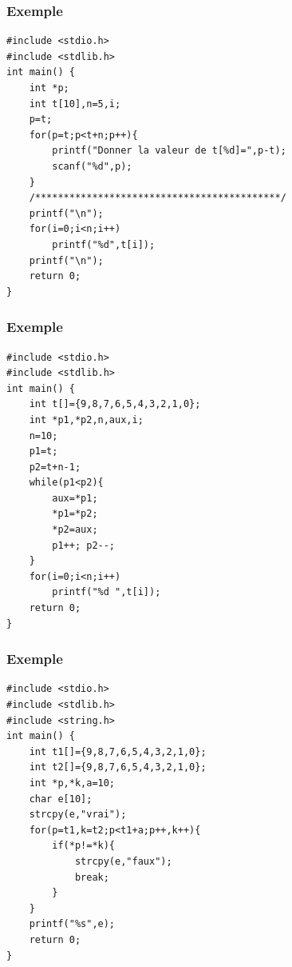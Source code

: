 \documentclass{beamer}
\begin{document}

\begin{frame}[fragile]
\frametitle{Exemple}

\begin{verbatim}
#include <stdio.h>
#include <stdlib.h>
int main() {
    int *p;
    int t[10],n=5,i;
    p=t;
    for(p=t;p<t+n;p++){
        printf("Donner la valeur de t[%d]=",p-t);
        scanf("%d",p);
    }
    /*******************************************/
    printf("\n");
    for(i=0;i<n;i++)
        printf("%d",t[i]);
    printf("\n");	
    return 0;
}
\end{verbatim}

\end{frame}


\begin{frame}[fragile]
\frametitle{Exemple}

\begin{verbatim}
#include <stdio.h>
#include <stdlib.h>
int main() {
    int t[]={9,8,7,6,5,4,3,2,1,0};
    int *p1,*p2,n,aux,i;
    n=10;
    p1=t;
    p2=t+n-1;
    while(p1<p2){
        aux=*p1;
        *p1=*p2;
        *p2=aux;
        p1++; p2--;
    }
    for(i=0;i<n;i++)
    	printf("%d ",t[i]);
    return 0;
}
\end{verbatim}

\end{frame}


\begin{frame}[fragile]
\frametitle{Exemple}

\begin{verbatim}
#include <stdio.h>
#include <stdlib.h>
#include <string.h>
int main() {
    int t1[]={9,8,7,6,5,4,3,2,1,0};
    int t2[]={9,8,7,6,5,4,3,2,1,0};
    int *p,*k,a=10;
    char e[10];
    strcpy(e,"vrai");
    for(p=t1,k=t2;p<t1+a;p++,k++){
        if(*p!=*k){
            strcpy(e,"faux");
            break;
        }
    }
    printf("%s",e);
    return 0;
}
\end{verbatim}

\end{frame}
\end{document}
